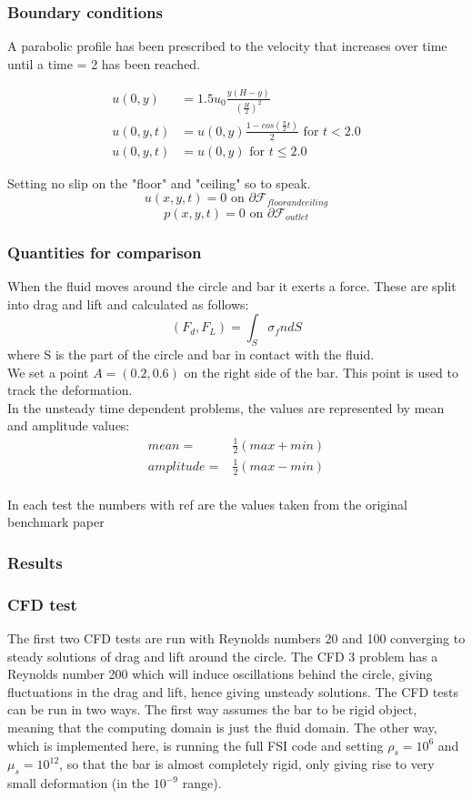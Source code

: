 \subsubsection*{Boundary conditions}
A parabolic profile has been prescribed to the velocity that increases over time until a time = 2 has been reached.

\begin{align*}
u(0,y) &= 1.5u_0 \frac{y(H-y)}{(\frac{H}{2})^2}  \\
u(0,y,t) &= u(0,y)\frac{1-cos(\frac{\pi}{2}t)}{2} \text{  for  } t<2.0 \\
u(0,y,t) &= u(0,y) \text{  for  } t \leq 2.0
\end{align*}

Setting no slip on the "floor" and "ceiling" so to speak.\\
$$ u(x,y,t) = 0 \text{  on  } \partial \mathcal{F}_{floor and ceiling} $$
$$  p(x,y,t) = 0 \text{  on  } \partial \mathcal{F}_{outlet} $$

\subsubsection*{Quantities for comparison}
When the fluid moves around the circle and bar it exerts a force. These are split into drag and lift and calculated as follows:
$$ (F_d, F_L) = \int_S \sigma_f n dS $$ 
where S is the part of the circle and bar in contact with the fluid. \\
We set a point $A = (0.2,0.6)$ on the right side of the bar. This point is used to track the deformation. \\
In the unsteady time dependent problems, the values are represented by mean and amplitude values:
\begin{align}
mean =& \frac{1}{2} (max + min) \\
amplitude =& \frac{1}{2} (max - min)\\
\end{align}

In each test the numbers with ref are the values taken from the original benchmark paper \cite{Hron2006a}

\subsubsection{Results}
\subsubsection{CFD test}
The first two CFD tests are run with Reynolds numbers 20 and 100 converging to steady solutions of drag and lift around the circle. The CFD 3 problem has a Reynolds number 200 which will induce oscillations behind the circle, giving fluctuations in the drag and lift, hence giving unsteady solutions.
The CFD tests can be run in two ways. The first way assumes the bar to be rigid object, meaning that the computing domain is just the fluid domain. The other way, which is implemented here, is running the full FSI code and setting $\rho_s=10^{6}$ and $\mu_s=10^{12}$, so that the bar is almost completely rigid, only giving rise to very small deformation (in the $10^{-9}$ range).

